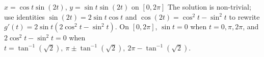 {$x=\cos t\sin(2t)$, $y=\sin t\sin(2t)$ on $[0,2\pi]$}
{The solution is non-trivial; use identities $\sin(2t)=2\sin t\cos t$ and $\cos(2t)=\cos^2t-\sin^2t$ to rewrite $g'(t) = 2\sin t(2\cos^2t-\sin^2t)$. On $[0,2\pi]$, $\sin t= 0$ when $t=0,\pi,2\pi$, and $2\cos^2t-\sin^2t=0$ when $t=\tan^{-1}(\sqrt{2}),\ \pi \pm \tan^{-1}(\sqrt{2}),\ 2\pi-\tan^{-1}(\sqrt{2})$.
}
